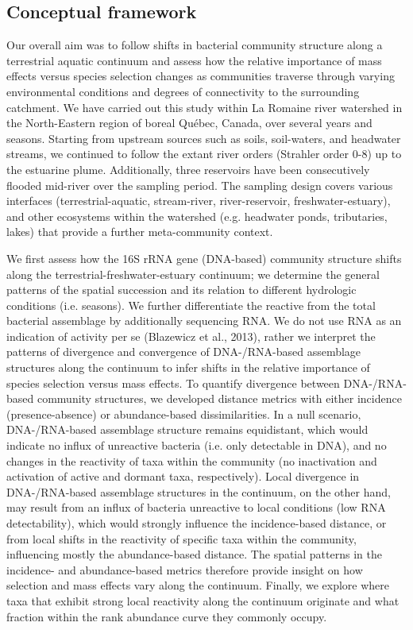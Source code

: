 \documentclass[12pt,a4paper]{article} %
\begin{document}
\subsection*{Conceptual framework}
Our overall aim was to follow shifts in bacterial community structure along a terrestrial aquatic continuum and assess how the relative importance of mass effects versus species selection changes as communities traverse through varying environmental conditions and degrees of connectivity to the surrounding catchment. We have carried out this study within La Romaine river watershed in the North-Eastern region of boreal Québec, Canada, over several years and seasons. Starting from upstream sources such as soils, soil-waters, and headwater streams, we continued to follow the extant river orders (Strahler order 0-8) up to the estuarine plume. Additionally, three reservoirs have been consecutively flooded mid-river over the sampling period. The sampling design covers various interfaces (terrestrial-aquatic, stream-river, river-reservoir, freshwater-estuary), and other ecosystems within the watershed (e.g. headwater ponds, tributaries, lakes) that provide a further meta-community context.

We first assess how the 16S rRNA gene (DNA-based) community structure shifts along the terrestrial-freshwater-estuary continuum; we determine the general patterns of the spatial succession and its relation to different hydrologic conditions (i.e. seasons). We further differentiate the reactive from the total bacterial assemblage by additionally sequencing RNA. We do not use RNA as an indication of activity per se (Blazewicz et al., 2013), rather we interpret the patterns of divergence and convergence of DNA-/RNA-based assemblage structures along the continuum to infer shifts in the relative importance of species selection versus mass effects. To quantify divergence between DNA-/RNA-based community structures, we developed distance metrics with either incidence (presence-absence) or abundance-based dissimilarities. In a null scenario, DNA-/RNA-based assemblage structure remains equidistant, which would indicate no influx of unreactive bacteria (i.e. only detectable in DNA), and no changes in the reactivity of taxa within the community (no inactivation and activation of active and dormant taxa, respectively). Local divergence in DNA-/RNA-based assemblage structures in the continuum, on the other hand, may result from an influx of bacteria unreactive to local conditions (low RNA detectability), which would strongly influence the incidence-based distance, or from local shifts in the reactivity of specific taxa within the community, influencing mostly the abundance-based distance. The spatial patterns in the incidence- and abundance-based metrics therefore provide insight on how selection and mass effects vary along the continuum. Finally, we explore where taxa that exhibit strong local reactivity along the continuum originate and what fraction within the rank abundance curve they commonly occupy.
\end{document}
